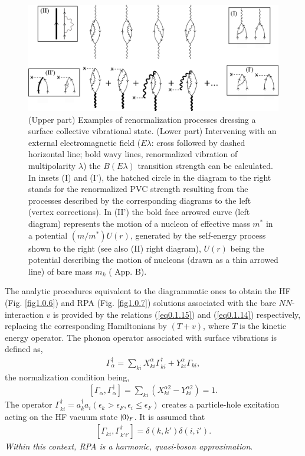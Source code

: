 \begin{figure}
	\centerline {
		\includegraphics*[width=15cm]{introduccion/figs/figpreface9}
	}
	\caption{(Upper part) Examples of renormalization processes dressing a surface collective vibrational state. (Lower part) Intervening with an external electromagnetic field ($E\lambda$: cross followed by dashed horizontal line; bold wavy lines, renormalized vibration of multipolarity $\lambda$) the $B(E\lambda)$ transition strength can be calculated. In insets (I) and (I'), the hatched circle in the diagram to the right stands for the renormalized PVC strength resulting from the processes described by the corresponding diagrams to the left (vertex corrections). In  (II') the bold face arrowed curve  (left diagram) represents  the motion of a nucleon of effective mass $m^*$ in a potential $(m/m^*)U(r)$, generated by the self-energy process shown to the right (see also (II) right diagram), $U(r)$  being the potential describing the motion of nucleons (drawn as a thin  arrowed line) of bare mass $m_k$  (\cite{Brink:05} App. B).}
	\label{fig1.0.9}
\end{figure}

The analytic procedures equivalent  to the diagrammatic ones to obtain the HF (Fig. \ref{fig1.0.6}) and RPA (Fig. \ref{fig1.0.7}) solutions associated with the bare $NN$-interaction $v$ is provided by the relations (\ref{eq0.1.15}) and (\ref{eq0.1.14}) respectively, replacing the corresponding Hamiltonians by $(T+v)$, where $T$ is the kinetic energy operator. The phonon operator associated with surface vibrations is defined as,
\begin{align}\label{eq1.0.26}
\Gamma_\alpha^\dagger=\sum_{ki}X_{ki}^\alpha\Gamma_{ki}^\dagger+Y_{ki}^\alpha\Gamma_{ki},
\end{align}
 the normalization condition being, 
\begin{align}\label{eq1.0.27}
\left[\Gamma_\alpha,\Gamma_\alpha^\dagger\right]=\sum_{ki}\left(X_{ki}^{\alpha2}-Y_{ki}^{\alpha2}\right)=1.
\end{align}
The operator $\Gamma^\dagger_{ki}=a^\dagger_{k}a_{i} (\epsilon_k>\epsilon_F,\epsilon_i\leq\epsilon_F)$ creates a particle-hole excitation acting on the HF vacuum state $|{0} \rangle_F$. It is assumed that
\begin{align}\label{eq1.0.28}
\left[\Gamma_{ki},\Gamma_{k'i'}^\dagger\right]=\delta(k,k')\delta(i,i').
\end{align}
\textit{Within this context, RPA is a harmonic, quasi-boson approximation}.


